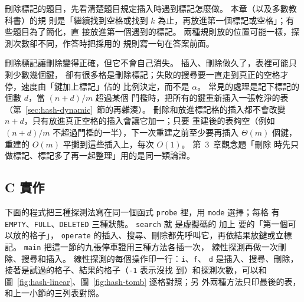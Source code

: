 \begin{examnote}
刪除標記的題目，先看清楚題目規定插入時遇到標記怎麼做。 本章（以及多數教科書）的規
則是「繼續找到空格或找到 $k$ 為止，再放進第一個標記或空格」；有些題目為了簡化，直
接放進第一個遇到的標記。 兩種規則放的位置可能一樣，探測次數卻不同，作答時把採用的
規則寫一句在答案前面。
\end{examnote}

刪除標記讓刪除變得正確，但它不會自己消失。 插入、刪除做久了，表裡可能只剩少數幾個鍵，
卻有很多格是刪除標記；失敗的搜尋要一直走到真正的空格才停，速度由「鍵加上標記」佔的
比例決定，而不是 $\alpha$。 常見的處理是記下標記的個數 $d$，當 $(n + d)/m$ 超過某個
門檻時，把所有的鍵重新插入一張乾淨的表（第~\ref{sec:hash-dynamic}~節的再雜湊）。
刪除和放進標記格的插入都不會改變 $n + d$，只有放進真正空格的插入會讓它加一；只要
重建後的表夠空（例如 $(n + d)/m$ 不超過門檻的一半），下一次重建之前至少要再插入
$\Theta(m)$ 個鍵，重建的 $O(m)$ 平攤到這些插入上，每次 $O(1)$。 第~3~章觀念題「刪除
時先只做標記、標記多了再一起整理」用的是同一類論證。

\subsection{C 實作}
\label{sec:hash-open-c}

下面的程式把三種探測法寫在同一個函式 \texttt{probe} 裡，用 \texttt{mode} 選擇；每格
有 \texttt{EMPTY}、\texttt{FULL}、\texttt{DELETED} 三種狀態。 \texttt{search} 就
是虛擬碼的  加上  要的「第一個可以放的格子」，
\texttt{operate} 的插入、搜尋、刪除都先呼叫它，再依結果放鍵或立標記。 \texttt{main} 把這一節的九張停車證用三種方法各插一次，
線性探測再做一次刪除、搜尋和插入。 線性探測的每個操作印一行：\texttt{i}、\texttt{f}、
\texttt{d} 是插入、搜尋、刪除，接著是試過的格子、結果的格子（\texttt{-1} 表示沒找
到）和探測次數，可以和圖~\ref{fig:hash-linear}、圖~\ref{fig:hash-tomb} 逐格對照；另
外兩種方法只印最後的表，和上一小節的三列表對照。

